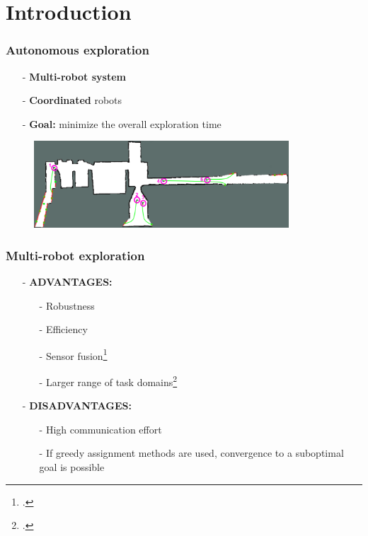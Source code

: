 \section{Introduction}
\begin{frame}
	\frametitle{Autonomous exploration}
	\begin{itemize}
		\item[-] \textbf{Multi-robot system} 
		\item[-] \textbf{Coordinated} robots 
		\item[-] \textbf{Goal:} minimize the overall exploration time
	\end{itemize}
	\begin{figure}	
	\centering
	\includegraphics[width=0.85\textwidth]{figures/siminprogress1}
	\end{figure}
\end{frame}

\begin{frame}
	\frametitle{Multi-robot exploration}
	\begin{itemize}
		\item[-] \textbf{ADVANTAGES:}
		\begin{itemize}
			\item[-] Robustness %
			\item[-] Efficiency %
			\item[-] Sensor fusion\footcite{Wurm2008} %
			\item[-] Larger range of task domains\footcite{Dias2006}
		\end{itemize}
		\item[-] \textbf{DISADVANTAGES:}
		\begin{itemize}
			\item[-] High communication effort%
			\item[-] If greedy assignment methods are used, convergence to a suboptimal goal is possible
		\end{itemize} 
	\end{itemize}
\end{frame}

